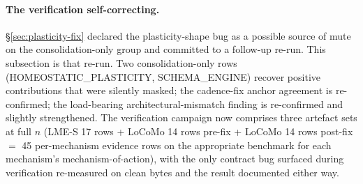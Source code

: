 \documentclass[11pt]{article}
\begin{document}
\paragraph{The verification self-correcting.}
\S\ref{sec:plasticity-fix} declared the plasticity-shape bug as a
possible source of mute on the consolidation-only group and committed
to a follow-up re-run.  This subsection is that re-run.  Two
consolidation-only rows (HOMEOSTATIC\_PLASTICITY, SCHEMA\_ENGINE)
recover positive contributions that were silently masked; the
cadence-fix anchor agreement is re-confirmed; the load-bearing
architectural-mismatch finding is re-confirmed and slightly
strengthened.  The verification campaign now comprises three
artefact sets at full $n$ (LME-S 17 rows + LoCoMo 14 rows pre-fix +
LoCoMo 14 rows post-fix $=$ 45 per-mechanism evidence rows on the
appropriate benchmark for each mechanism's mechanism-of-action),
with the only contract bug surfaced during verification re-measured
on clean bytes and the result documented either way.



\end{document}
